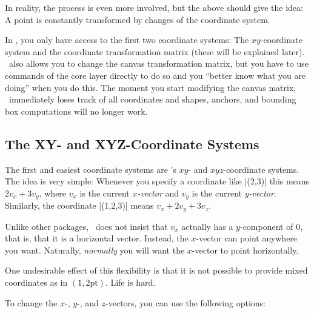 In reality, the process is even more involved, but the above should give the
idea: A point is constantly transformed by changes of the coordinate system.

In \tikzname, you only have access to the first two coordinate systems: The
$xy$-coordinate system and the coordinate transformation matrix (these will be
explained later). \pgfname\ also allows you to change the canvas transformation
matrix, but you have to use commands of the core layer directly to do so and
you ``better know what you are doing'' when you do this. The moment you start
modifying the canvas matrix, \pgfname\ immediately loses track of all
coordinates and shapes, anchors, and bounding box computations will no longer
work.


\subsection{The XY- and XYZ-Coordinate Systems}
\label{section-xyz}

The first and easiest coordinate systems are \pgfname's $xy$- and
$xyz$-coordinate systems. The idea is very simple: Whenever you specify a
coordinate like |(2,3)| this means $2v_x + 3v_y$, where $v_x$ is the current
\emph{$x$-vector} and $v_y$ is the current \emph{$y$-vector}. Similarly, the
coordinate |(1,2,3)| means $v_x + 2v_y + 3v_z$.

Unlike other packages, \pgfname\ does not insist that $v_x$ actually has a
$y$-component of $0$, that is, that it is a horizontal vector. Instead, the
$x$-vector can point anywhere you want. Naturally, \emph{normally} you will
want the $x$-vector to point horizontally.

One undesirable effect of this flexibility is that it is not possible to
provide mixed coordinates as in $(1,2\mathrm{pt})$. Life is hard.

To change the $x$-, $y$-, and $z$-vectors, you can use the following options:

